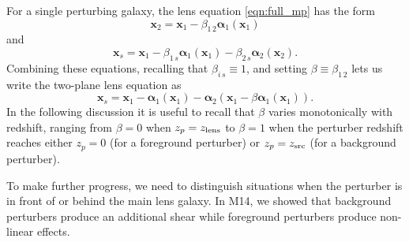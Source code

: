 \documentclass{emulateapj}
\newcommand\x[0]{\mathbf{x}}
\newcommand\al[0]{\boldsymbol{\alpha}}
\begin{document}
For a single perturbing galaxy, the lens equation \ref{eqn:full_mp} has the form
\begin{equation}
\x_2 = \x_1 - \beta_{1\,2} \al_1(\x_1)
\end{equation}
and
\begin{equation}
\x_s = \x_1 - \beta_{1\,s} \al_1(\x_1) - \beta_{2\,s} \al_2(\x_2).
\end{equation}
Combining these equations, recalling that $\beta_{i\,s} \equiv 1$, and setting $\beta \equiv \beta_{1\,2}$ lets us write the two-plane lens equation as
\begin{equation}
\x_s = \x_1 - \al_1(\x_1) - \al_2\left(\x_1 - \beta \al_1(\x_1)\right).
\label{eqn:twoplane}
\end{equation}
In the following discussion it is useful to recall that $\beta$ varies monotonically with redshift, ranging from $\beta = 0$ when $z_p = z_{\rm{lens}}$ to $\beta = 1$ when the perturber redshift reaches either $z_p = 0$ (for a foreground perturber) or $z_p = z_{\rm{src}}$ (for a background perturber).

To make further progress, we need to distinguish situations when the perturber is in front of or behind the main lens galaxy. In M14, we showed that background perturbers produce an additional shear while foreground perturbers produce non-linear effects.
\end{document}
